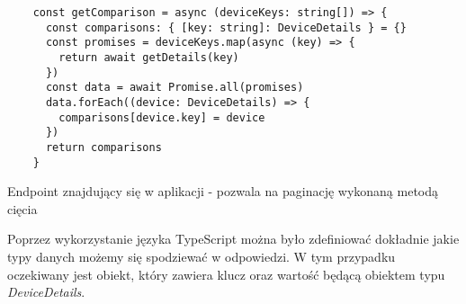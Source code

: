 \begin{code}[H]
  \begin{verbatim}
    const getComparison = async (deviceKeys: string[]) => {
      const comparisons: { [key: string]: DeviceDetails } = {}
      const promises = deviceKeys.map(async (key) => {
        return await getDetails(key)
      })
      const data = await Promise.all(promises)
      data.forEach((device: DeviceDetails) => {
        comparisons[device.key] = device
      })
      return comparisons
    }
  \end{verbatim}
  \caption{Endpoint znajdujący się w aplikacji - pozwala na paginację wykonaną metodą cięcia}
  \label{getting_devices}
\end{code}
Poprzez wykorzystanie języka TypeScript można było zdefiniować dokładnie jakie typy danych możemy się spodziewać w odpowiedzi. W tym przypadku oczekiwany jest obiekt, który zawiera klucz oraz wartość będącą obiektem typu \textit{DeviceDetails}.







